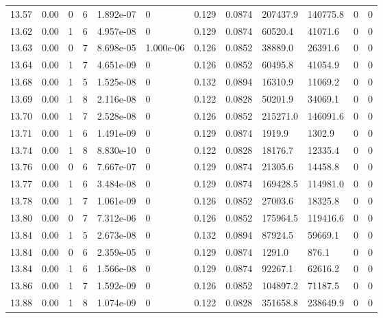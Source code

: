 \documentclass[preview]{standalone}
\begin{document}
{{{{{{{{{{{{{{{{{\begin{tabular}{L{1.2cm}C{1.2cm} C{0.3cm}C{0.5cm} C{1.4cm}C{1.4cm} C{1.4cm}C{1.4cm} C{1.6cm}C{1.6cm} C{1.6cm}C{1.6cm}}
  13.57  &  0.00  & 0     &  6 &  1.892e-07  & 0  &  0.129&   0.0874& 207437.9 & 140775.8   &  0 & 0  \\ 
  13.62  &  0.00  & 1     &  6 &  4.957e-08  & 0  &  0.129&   0.0874& 60520.4 & 41071.6   &  0 & 0  \\ 
  13.63  &  0.00  & 0     &  7 &  8.698e-05  & 1.000e-06  &  0.126&   0.0852& 38889.0 & 26391.6   &  0 & 0  \\ 
  13.64  &  0.00  & 1     &  7 &  4.651e-09  & 0  &  0.126&   0.0852& 60495.8 & 41054.9   &  0 & 0  \\ 
  13.68  &  0.00  & 1     &  5 &  1.525e-08  & 0  &  0.132&   0.0894& 16310.9 & 11069.2   &  0 & 0  \\ 
  13.69  &  0.00  & 1     &  8 &  2.116e-08  & 0  &  0.122&   0.0828& 50201.9 & 34069.1   &  0 & 0  \\ 
  13.70  &  0.00  & 1     &  7 &  2.528e-08  & 0  &  0.126&   0.0852& 215271.0 & 146091.6   &  0 & 0  \\ 
  13.71  &  0.00  & 1     &  6 &  1.491e-09  & 0  &  0.129&   0.0874& 1919.9 & 1302.9   &  0 & 0  \\ 
  13.74  &  0.00  & 1     &  8 &  8.830e-10  & 0  &  0.122&   0.0828& 18176.7 & 12335.4   &  0 & 0  \\ 
  13.76  &  0.00  & 0     &  6 &  7.667e-07  & 0  &  0.129&   0.0874& 21305.6 & 14458.8   &  0 & 0  \\ 
  13.77  &  0.00  & 1     &  6 &  3.484e-08  & 0  &  0.129&   0.0874& 169428.5 & 114981.0   &  0 & 0  \\ 
  13.78  &  0.00  & 1     &  7 &  1.061e-09  & 0  &  0.126&   0.0852& 27003.6 & 18325.8   &  0 & 0  \\ 
  13.80  &  0.00  & 0     &  7 &  7.312e-06  & 0  &  0.126&   0.0852& 175964.5 & 119416.6   &  0 & 0  \\ 
  13.84  &  0.00  & 1     &  5 &  2.673e-08  & 0  &  0.132&   0.0894& 87924.5 & 59669.1   &  0 & 0  \\ 
  13.84  &  0.00  & 0     &  6 &  2.359e-05  & 0  &  0.129&   0.0874& 1291.0 & 876.1   &  0 & 0  \\ 
  13.84  &  0.00  & 1     &  6 &  1.566e-08  & 0  &  0.129&   0.0874& 92267.1 & 62616.2   &  0 & 0  \\ 
  13.86  &  0.00  & 1     &  7 &  1.592e-09  & 0  &  0.126&   0.0852& 104897.2 & 71187.5   &  0 & 0  \\ 
  13.88  &  0.00  & 1     &  8 &  1.074e-09  & 0  &  0.122&   0.0828& 351658.8 & 238649.9   &  0 & 0  \\ 

\end{tabular}}}}}}}}}}}}}}}}}}
\end{document}
